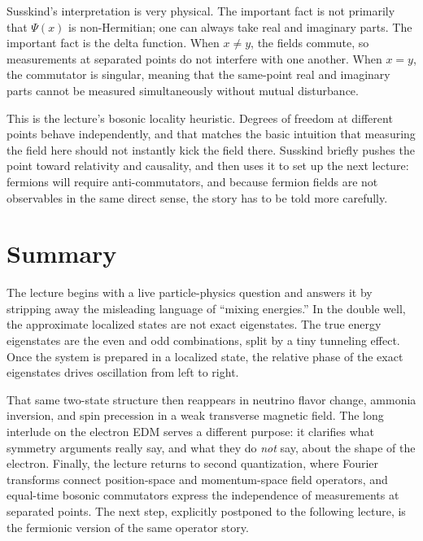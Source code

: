 Susskind's interpretation is very physical. The important fact is not primarily that \(\Psi(x)\) is non-Hermitian; one can always take real and imaginary parts. The important fact is the delta function. When \(x\neq y\), the fields commute, so measurements at separated points do not interfere with one another. When \(x=y\), the commutator is singular, meaning that the same-point real and imaginary parts cannot be measured simultaneously without mutual disturbance.

This is the lecture's bosonic locality heuristic. Degrees of freedom at different points behave independently, and that matches the basic intuition that measuring the field here should not instantly kick the field there. Susskind briefly pushes the point toward relativity and causality, and then uses it to set up the next lecture: fermions will require anti-commutators, and because fermion fields are not observables in the same direct sense, the story has to be told more carefully.

\section{Summary}

The lecture begins with a live particle-physics question and answers it by stripping away the misleading language of ``mixing energies.'' In the double well, the approximate localized states are not exact eigenstates. The true energy eigenstates are the even and odd combinations, split by a tiny tunneling effect. Once the system is prepared in a localized state, the relative phase of the exact eigenstates drives oscillation from left to right.

That same two-state structure then reappears in neutrino flavor change, ammonia inversion, and spin precession in a weak transverse magnetic field. The long interlude on the electron EDM serves a different purpose: it clarifies what symmetry arguments really say, and what they do \emph{not} say, about the shape of the electron. Finally, the lecture returns to second quantization, where Fourier transforms connect position-space and momentum-space field operators, and equal-time bosonic commutators express the independence of measurements at separated points. The next step, explicitly postponed to the following lecture, is the fermionic version of the same operator story.